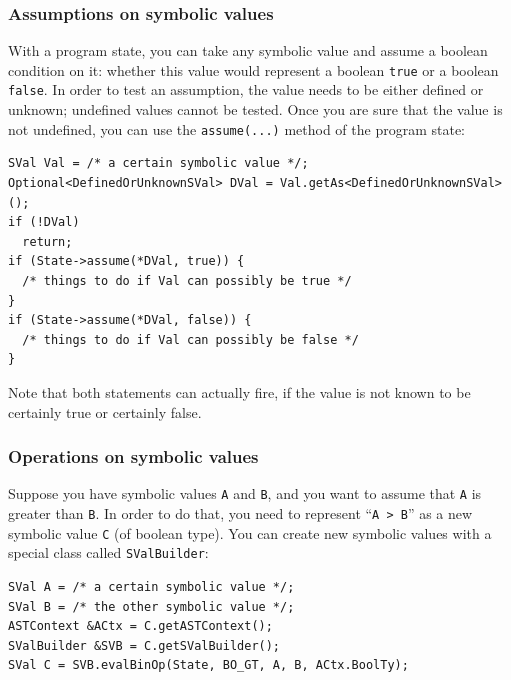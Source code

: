 \documentclass[a4paper,12pt]{article}
\newenvironment{nobr}{\begin{minipage}{\textwidth}\setlength\parskip{1em}
}{\end{minipage}\ignorespacesafterend}
\begin{document}
\begin{nobr}
\subsubsection{Assumptions on symbolic values}\label{subsubsec:assumptions}

With a program state, you can take any symbolic value and assume a boolean condition on it: whether this value would represent a boolean \lstinline|true| or a boolean \lstinline|false|. In order to test an assumption, the value needs to be either defined or unknown; undefined values cannot be tested. Once you are sure that the value is not undefined, you can use the \lstinline|assume(...)| method of the program state:

\begin{lstlisting}[style=cplusplus,numbers=none]
SVal Val = /* a certain symbolic value */;
Optional<DefinedOrUnknownSVal> DVal = Val.getAs<DefinedOrUnknownSVal>();
if (!DVal)
  return;
if (State->assume(*DVal, true)) {
  /* things to do if Val can possibly be true */
}
if (State->assume(*DVal, false)) {
  /* things to do if Val can possibly be false */
}
\end{lstlisting}
\end{nobr}

Note that both statements can actually fire, if the value is not known to be certainly true or certainly false.

\begin{nobr}
\subsubsection{Operations on symbolic values}

Suppose you have symbolic values \lstinline|A| and \lstinline|B|, and you want to assume that \lstinline|A| is greater than \lstinline|B|. In order to do that, you need to represent ``\lstinline|A > B|'' as a new symbolic value \lstinline|C| (of boolean type). You can create new symbolic values with a special class called \lstinline|SValBuilder|:

\begin{lstlisting}[style=cplusplus,numbers=none]
SVal A = /* a certain symbolic value */;
SVal B = /* the other symbolic value */;
ASTContext &ACtx = C.getASTContext();
SValBuilder &SVB = C.getSValBuilder();
SVal C = SVB.evalBinOp(State, BO_GT, A, B, ACtx.BoolTy);
\end{lstlisting}
\end{nobr}
\end{document}
